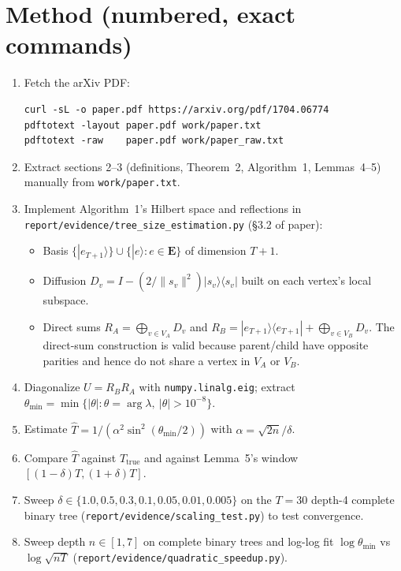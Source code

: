 \documentclass[11pt]{article}
\begin{document}
\section{Method (numbered, exact commands)}
\begin{enumerate}
\item Fetch the arXiv PDF:
\begin{lstlisting}
curl -sL -o paper.pdf https://arxiv.org/pdf/1704.06774
pdftotext -layout paper.pdf work/paper.txt
pdftotext -raw    paper.pdf work/paper_raw.txt
\end{lstlisting}
\item Extract sections 2--3 (definitions, Theorem~2, Algorithm~1, Lemmas~4--5)
      manually from \verb|work/paper.txt|.
\item Implement Algorithm~1's Hilbert space and reflections in
      \verb|report/evidence/tree_size_estimation.py| (\S3.2 of paper):
      \begin{itemize}
        \item Basis $\{|e_{T+1}\rangle\} \cup \{|e\rangle : e \in \mathbf E\}$
              of dimension $T + 1$.
        \item Diffusion $D_v = I - (2/\|s_v\|^2) |s_v\rangle\langle s_v|$
              built on each vertex's local subspace.
        \item Direct sums $R_A = \bigoplus_{v \in V_A} D_v$ and
              $R_B = |e_{T+1}\rangle\langle e_{T+1}| + \bigoplus_{v \in V_B} D_v$.
              The direct-sum construction is valid because parent/child have
              opposite parities and hence do not share a vertex in $V_A$ or
              $V_B$.
      \end{itemize}
\item Diagonalize $U = R_B R_A$ with \verb|numpy.linalg.eig|; extract
      $\theta_{\min} = \min\{|\theta| : \theta = \arg\lambda,\ |\theta|>10^{-8}\}$.
\item Estimate $\hat T = 1/(\alpha^2 \sin^2(\theta_{\min}/2))$ with
      $\alpha = \sqrt{2n}/\delta$.
\item Compare $\hat T$ against $T_{\text{true}}$ and against Lemma~5's window
      $[(1-\delta)T, (1+\delta)T]$.
\item Sweep $\delta \in \{1.0, 0.5, 0.3, 0.1, 0.05, 0.01, 0.005\}$ on the
      $T=30$ depth-4 complete binary tree
      (\verb|report/evidence/scaling_test.py|) to test convergence.
\item Sweep depth $n \in [1,7]$ on complete binary trees and log-log fit
      $\log \theta_{\min}$ vs $\log\!\sqrt{nT}$
      (\verb|report/evidence/quadratic_speedup.py|).
\end{enumerate}
\end{document}
